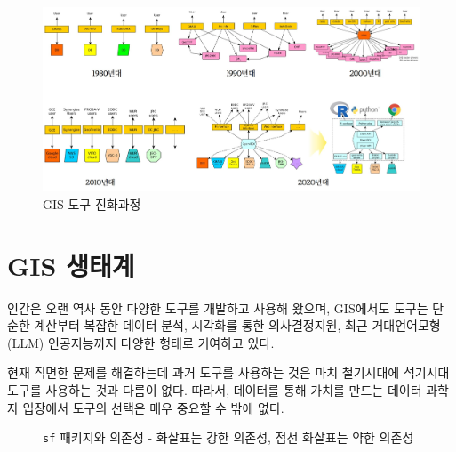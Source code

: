 \documentclass[
  a4paper,showtrims,openright,hidelinks]{oblivoir}
\begin{document}
\begin{figure}[H]

{\centering \includegraphics{images/gis_evolution.jpg}

}

\caption{GIS 도구 진화과정}

\end{figure}%

\section{GIS 생태계}\label{gis-uxc0dduxd0dcuxacc4}

인간은 오랜 역사 동안 다양한 도구를 개발하고 사용해 왔으며, GIS에서도
도구는 단순한 계산부터 복잡한 데이터 분석, 시각화를 통한 의사결정지원,
최근 거대언어모형(LLM) 인공지능까지 다양한 형태로 기여하고 있다.

현재 직면한 문제를 해결하는데 과거 도구를 사용하는 것은 마치 철기시대에
석기시대 도구를 사용하는 것과 다름이 없다. 따라서, 데이터를 통해 가치를
만드는 데이터 과학자 입장에서 도구의 선택은 매우 중요할 수 밖에 없다.

\begin{figure}


\caption{\label{fig-evolution}\texttt{sf} 패키지와 의존성 - 화살표는
강한 의존성, 점선 화살표는 약한 의존성}

\end{figure}%
\end{document}
